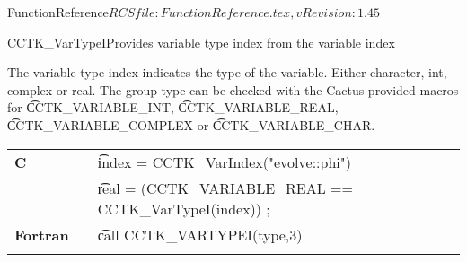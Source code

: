 \begin{cactuspart}{5}{FunctionReference}{$RCSfile: FunctionReference.tex,v $}{$Revision: 1.45 $}
\begin{CCTKFunc}{CCTK\_VarTypeI}{Provides variable type index from the variable index}
\label{CCTK-VarTypeI}
\showargs
\begin{params}
\end{params}
\begin{discussion}
The variable type index indicates the type of the variable.
Either character, int, complex or real. The group type can be checked
with the Cactus provided macros for {\t CCTK\_VARIABLE\_INT}, {\t CCTK\_VARIABLE\_REAL}, {\t CCTK\_VARIABLE\_COMPLEX} or {\t CCTK\_VARIABLE\_CHAR}.
\end{discussion}
\begin{examples}
\begin{tabular}{@{}p{3cm}cp{11cm}}
\hfill {\bf C} && {\t index = CCTK\_VarIndex("evolve::phi")}\\
               &&{\t real = (CCTK\_VARIABLE\_REAL == CCTK\_VarTypeI(index)) ;}
\\
\hfill {\bf Fortran} && {\t call CCTK\_VARTYPEI(type,3)}\\
\\
\end{tabular}
\end{examples}
\begin{errorcodes}
\end{errorcodes}
\end{CCTKFunc}







\end{cactuspart}
